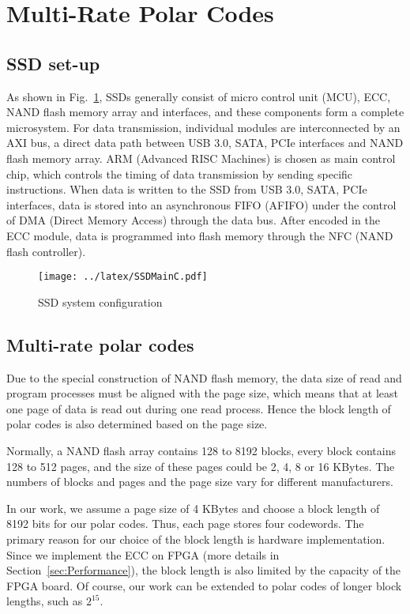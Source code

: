 \documentclass{article}
\begin{document}
\section{Multi-Rate Polar Codes}
\label{sec:code}
\subsection{SSD set-up}
As shown in Fig.~\ref{fig:SSDMainC}, SSDs generally consist of micro control unit (MCU), ECC, NAND flash memory array and interfaces, and these components form a complete microsystem.
For data transmission, individual modules are interconnected by an AXI bus, a direct data path between USB 3.0, SATA, PCIe interfaces and NAND flash memory array. ARM (Advanced RISC Machines) is chosen as main control chip, which controls the timing of data transmission by sending specific instructions. When data is written to the SSD from USB 3.0, SATA, PCIe interfaces, data is stored into an asynchronous FIFO (AFIFO) under the control of DMA (Direct Memory Access) through the data bus.  After encoded in the ECC module, data is programmed into flash memory through the NFC (NAND flash controller).


\begin{figure}[htbp]
\centering
\texttt{[image: ../latex/SSDMainC.pdf]}
\caption{SSD system configuration}
\label{fig:SSDMainC}
\end{figure}


\subsection{Multi-rate polar codes}
Due to the special construction of NAND flash memory, the data size of read and program processes must be aligned with the page size, which means that at least one page of data is read out during one read process. Hence the block length of polar codes is also determined based on the page size.

Normally, a NAND flash array contains 128 to 8192 blocks, every block contains 128 to 512 pages, and the size of these pages could be 2, 4, 8 or 16 KBytes. The numbers of blocks and pages and the page size vary for different manufacturers.

In our work, we assume a page size of 4 KBytes and choose a block length of 8192 bits for our polar codes. 
Thus, each page stores four codewords. 
The primary reason for our choice of the block length is hardware implementation. Since we
implement the ECC on FPGA (more details in Section~\ref{sec:Performance}), the block length is also limited by the capacity of the FPGA board. Of course, our work can be extended to polar codes of longer block lengths, such as $2^{15}$.
\end{document}
